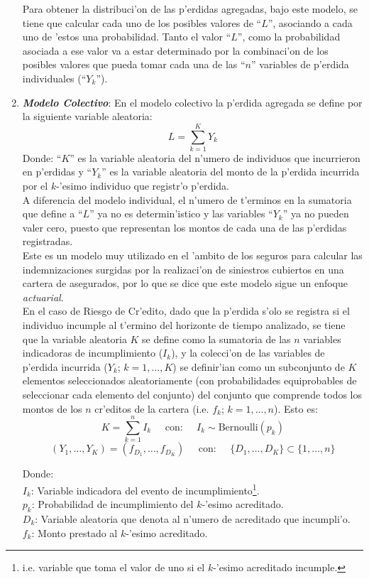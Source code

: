 \documentclass[10pt, oneside]{article}
\begin{document}
\begin{enumerate}
Para obtener la distribuci'on de las p'erdidas agregadas, bajo este modelo, se tiene que calcular cada uno de los posibles valores de ``$L$'', asociando a cada uno de 'estos una probabilidad. Tanto el valor ``$L$'', como la probabilidad asociada a ese valor va a estar determinado por la combinaci'on de los posibles valores que pueda tomar cada una de las ``$n$'' variables de p'erdida individuales (``$Y_k$'').

\item \textbf{\emph{Modelo Colectivo}}: 
En el modelo colectivo la p'erdida agregada se define por la siguiente variable aleatoria:
\[
L = \sum_{k=1}^{K} Y_k
\]
Donde: ``$K$'' es la variable aleatoria del n'umero de individuos que incurrieron en p'erdidas y ``$Y_k$'' es la variable aleatoria del monto de la p'erdida incurrida por el $k$-'esimo individuo que registr'o p'erdida.\\

A diferencia del modelo individual, el n'umero de t'erminos en la sumatoria que define a ``$L$'' ya no es determin'istico y las variables ``$Y_k$'' ya no pueden valer cero, puesto que representan los montos de cada una de las p'erdidas registradas.\\

Este es un modelo muy utilizado en el 'ambito de los seguros para calcular las indemnizaciones surgidas por la realizaci'on de siniestros cubiertos en una cartera de asegurados, por lo que se dice que este modelo sigue un enfoque \emph{actuarial}.\\

En el caso de Riesgo de Cr'edito, dado que la p'erdida s'olo se registra si el individuo incumple al t'ermino del horizonte de tiempo analizado, se tiene que la variable aleatoria $K$ se define como la sumatoria de las $n$ variables indicadoras de incumplimiento ($I_k$), y la colecci'on de las variables de p'erdida incurrida ($Y_k$; $k=1,\ldots, K$) se definir'ian como un subconjunto de $K$ elementos seleccionados aleatoriamente (con probabilidades equiprobables de seleccionar cada elemento del conjunto) del conjunto que comprende todos los montos de los $n$ cr'editos de la cartera (i.e. $f_k$; $k=1,\ldots, n$). Esto es:\\

\[K=\sum_{k=1}^{n} I_k\;\;\;\;\;\mbox{con:}\;\;\;\;\;I_k\sim\mbox{Bernoulli}(p_k)\]
\[(Y_1,\ldots, Y_K) = (f_{D_1},\ldots, f_{D_K}) \;\;\;\;\;\mbox{con:}\;\;\;\;\;\{D_1,\ldots, D_K\} \subset \{1, \ldots, n\} \]

\indent  Donde:\\
\indent \indent $I_k$: Variable indicadora del evento de incumplimiento\footnote{i.e. variable que toma el valor de uno si el $k$-'esimo acreditado incumple.}.\\
\indent \indent $p_k$: Probabilidad de incumplimiento del $k$-'esimo acreditado.\\
\indent \indent $D_k$: Variable aleatoria que denota al n'umero de acreditado que incumpli'o.\\
\indent \indent $f_k$: Monto prestado al $k$-'esimo acreditado.\\


\end{enumerate}
\end{document}
